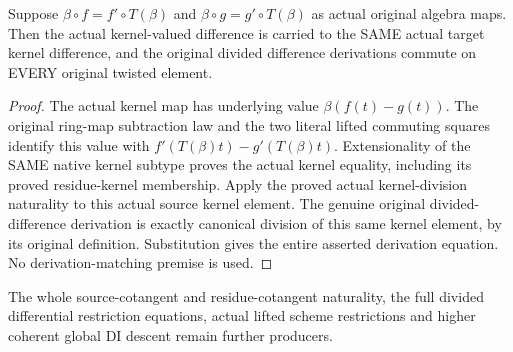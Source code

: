 \begin{theorem}
\label{thm:witt-two-actual-lift-difference-naturality}
\leanok
{}
Suppose $\beta\circ f=f'\circ T(\beta)$ and
$\beta\circ g=g'\circ T(\beta)$ as actual original algebra maps.
Then the actual kernel-valued difference is carried to the SAME
actual target kernel difference, and the original divided
difference derivations commute on EVERY original twisted element.
\end{theorem}
\begin{proof}
The actual kernel map has underlying value $\beta(f(t)-g(t))$.
The original ring-map subtraction law and the two literal lifted
commuting squares identify this value with
$f'(T(\beta)t)-g'(T(\beta)t)$. Extensionality of the SAME native
kernel subtype proves the actual kernel equality, including its
proved residue-kernel membership. Apply the proved actual
kernel-division naturality to this actual source kernel element.
The genuine original divided-difference derivation is exactly
canonical division of this same kernel element, by its original
definition. Substitution gives the entire asserted derivation
equation. No derivation-matching premise is used.
\end{proof}

The whole source-cotangent and residue-cotangent naturality, the
full divided differential restriction equations, actual lifted
scheme restrictions and higher coherent global DI descent remain
further producers.
